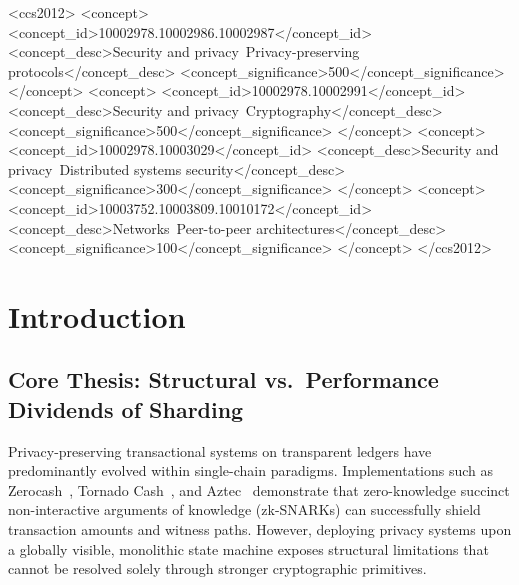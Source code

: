 \documentclass[sigconf,nonacm]{acmart}
\begin{document}
\begin{CCSXML}
<ccs2012>
   <concept>
       <concept_id>10002978.10002986.10002987</concept_id>
       <concept_desc>Security and privacy~Privacy-preserving protocols</concept_desc>
       <concept_significance>500</concept_significance>
   </concept>
   <concept>
       <concept_id>10002978.10002991</concept_id>
       <concept_desc>Security and privacy~Cryptography</concept_desc>
       <concept_significance>500</concept_significance>
   </concept>
   <concept>
       <concept_id>10002978.10003029</concept_id>
       <concept_desc>Security and privacy~Distributed systems security</concept_desc>
       <concept_significance>300</concept_significance>
   </concept>
   <concept>
       <concept_id>10003752.10003809.10010172</concept_id>
       <concept_desc>Networks~Peer-to-peer architectures</concept_desc>
       <concept_significance>100</concept_significance>
   </concept>
</ccs2012>
\end{CCSXML}



\maketitle

\section{Introduction}

\subsection{Core Thesis: Structural vs.\ Performance Dividends of Sharding}
Privacy-preserving transactional systems on transparent ledgers have predominantly evolved within single-chain paradigms. Implementations such as Zerocash~\cite{sasson2014zerocash}, Tornado Cash~\cite{pertsev2019tornado}, and Aztec~\cite{aztec2022} demonstrate that zero-knowledge succinct non-interactive arguments of knowledge (zk-SNARKs) can successfully shield transaction amounts and witness paths. However, deploying privacy systems upon a globally visible, monolithic state machine exposes structural limitations that cannot be resolved solely through stronger cryptographic primitives.
\end{document}

